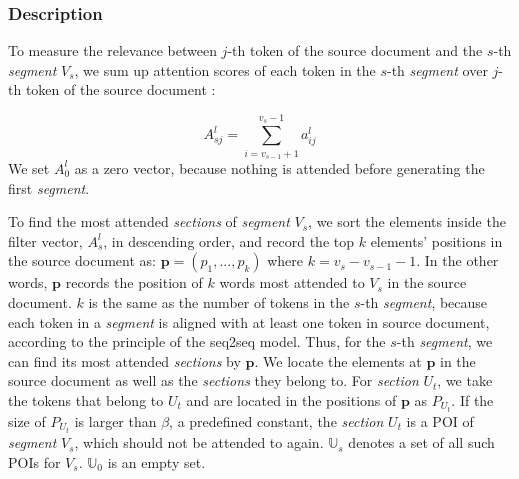 \subsubsection{Description}
\label{sec:des}
To measure the relevance between $j$-th token of the source document 
and the $s$-th \textit{segment} $V_s$,
we sum up attention scores 
of each token in the $s$-th \textit{segment} over $j$-th token of the source document :

\begin{equation}
    A_{sj}^{l} = \sum_{i=v_{s-1}+1}^{v_{s}-1}a_{ij}^{l}
\end{equation}
We set $A_{0}^{l}$ as a zero vector, because nothing is attended before generating 
the first \textit{segment}. 


To find the most attended \textit{sections} of {\em segment} $V_s$, 
we sort the elements inside the filter vector, 
$A_{s}^{l}$, in descending order, 
and record the top $k$ elements' positions in 
the source document as: 
$\mathbf{p}=(p_{1},...,p_{k})$
where $k=v_{s}-v_{s-1}-1$. 
In the other words, 
$\mathbf{p}$ records the position of $k$ words most attended to $V_s$ in the source document.
$k$ is the same as the number of tokens in the $s$-th \textit{segment},
because each token in a \textit{segment} is aligned with at least one token in source document, according to the principle of the seq2seq model.
Thus, for the $s$-th \textit{segment}, 
we can find its most attended \textit{sections} by $\mathbf{p}$.
We locate the elements at $\mathbf{p}$ in the source document as well as
the \textit{sections} they belong to. 
For {\em section} $U_t$, we take the tokens that belong to $U_t$ and are located in the positions of $\mathbf{p}$ as $P_{U_{t}}$. 
If the size of $P_{U_{t}}$ is larger than
$\beta$, a predefined constant,
the \textit{section} $U_{t}$ is a POI of {\em segment} $V_{s}$,
which should not be attended to again. 
$\mathbb{U}_{s}$ denotes a set of all such POIs for $V_s$.
$\mathbb{U}_{0}$ is an empty set.

